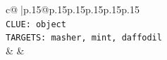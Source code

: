 \documentclass{article}
\begin{document}
{\begin{supertabular}{c@{$\;$}|p{.15\linewidth}@{}p{.15\linewidth}p{.15\linewidth}p{.15\linewidth}p{.15\linewidth}p{.15\linewidth}}
{{{\\ 
\texttt{CLUE: object} \\
\texttt{TARGETS: masher, mint, daffodil} \\
            }
        }
    }
    & & \\ \\

\end{supertabular}
}
\end{document}
